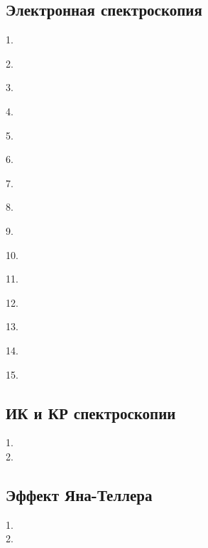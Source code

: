 \subsection{Электронная спектроскопия}
1. \par
2. \par
3. \par
4. \par
5. \par
6. \par
7. \par
8. \par
9. \par
10. \par
11. \par
12. \par
13. \par
14. \par
15. \par
\newpage

\subsection{ИК и КР спектроскопии}
1. \\
2. 
\newpage

\subsection{Эффект Яна-Теллера}
1. \\
2. 
\newpage


